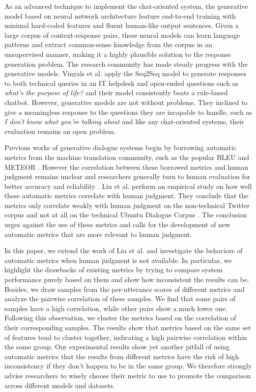 \documentclass[runningheads]{llncs}
\begin{document}
    As an advanced technique to implement the chat-oriented system, the generative model based on neural network architecture feature end-to-end training with minimal hard-coded features and fluent human-like output sentences. Given a large corpus of context-response pairs, these neural models can learn language patterns and extract common-sense knowledge from the corpus in an unsupervised manner, making it a highly plausible solution to the response generation problem. The research community has made steady progress with the generative models. Vinyals et al. \cite{GoogleChatbot} apply the Seq2Seq model \cite{Seq2Seq} to generate responses to both technical queries in an IT helpdesk and open-ended questions such as \textit{what's the purpose of life?} and their model consistently beats a rule-based chatbot. However, generative models are not without problems. They inclined to give a meaningless response to the questions they are incapable to handle, such as \textit{I don't know what you're talking about} and like any chat-oriented systems, their evaluation remains an open problem.

    Previous works of generative dialogue systems begin by borrowing automatic metrics from the machine translation community, such as the popular BLEU \cite{BLEU} and METEOR \cite{METEOR}. However the correlation between these borrowed metrics and human judgment remains unclear and researchers generally turn to human evaluation for better accuracy and reliability \cite{Shang,DCGM,VHRED}. Liu et al. \cite{HowNot} perform an empirical study on how well these automatic metrics correlate with human judgment. They conclude that the metrics only correlate weakly with human judgment on the non-technical Twitter corpus and not at all on the technical Ubuntu Dialogue Corpus \cite{ubuntu_corpus}. The conclusion urges against the use of these metrics and calls for the development of new automatic metrics that are more relevant to human judgment.

    In this paper, we extend the work of Liu et al. and investigate the behaviors of automatic metrics when human judgment is not available. In particular, we highlight the drawbacks of existing metrics by trying to compare system performance purely based on them and show how inconsistent the results can be. Besides, we draw samples from the per-utterance scores of different metrics and analyze the pairwise correlation of these samples. We find that some pairs of samples have a high correlation, while other pairs show a much lower one. Following this observation, we cluster the metrics based on the correlation of their corresponding samples. The results show that metrics based on the same set of features tend to cluster together, indicating a high pairwise correlation within the same group. Our experimental results show yet another pitfall of using automatic metrics that the results from different metrics have the risk of high inconsistency if they don't happen to be in the same group. We therefore strongly advise researchers to wisely choose their metric to use to promote the comparison across different models and datasets.
\end{document}
